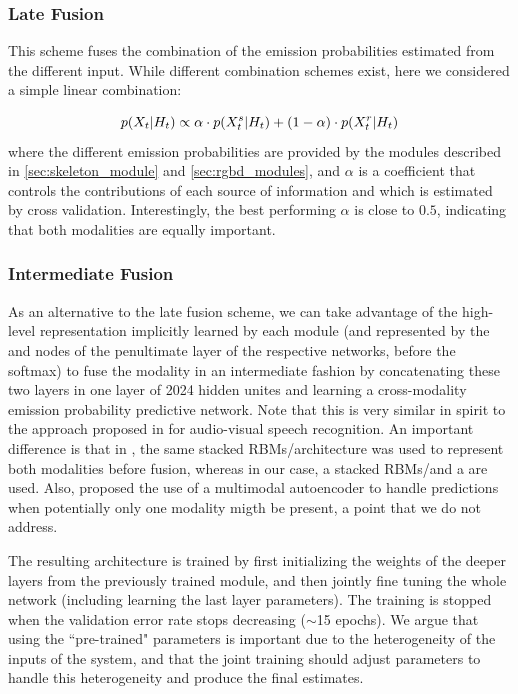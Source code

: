 \subsubsection{Late Fusion}
%
This scheme fuses the combination of the emission probabilities estimated from the different input.
While different combination schemes exist, here we considered a simple linear combination:

\begin{equation}
 p(X_t | H_t)  \propto  \alpha \cdot  p(X_t^s | H_t) + (1-\alpha)\cdot p(X_t^r | H_t)
\end{equation}
where the different emission probabilities are provided by the modules described in \ref{sec:skeleton_module} and \ref{sec:rgbd_modules},
and $\alpha$ is a coefficient that controls the contributions of each source of information and which is estimated by cross validation.
Interestingly, the best performing $\alpha$ is close to $0.5$, indicating that both modalities are equally important.


\subsubsection{Intermediate Fusion}
\label{early_fusion}

As an alternative to the late fusion scheme, we can take advantage of the high-level representation implicitly learned by each module
(and represented by the \highSK and \highRGBD nodes of the penultimate layer of the respective networks, before the softmax)
to fuse the modality in an intermediate fashion by concatenating these two layers in one layer of 2024 hidden unites
and learning a cross-modality emission probability predictive network.
%
Note that this is very similar in spirit to the approach proposed in \cite{Ngiam2011multimodal}
for audio-visual speech recognition.
%
An important difference is that in \cite{Ngiam2011multimodal}, the same stacked RBMs/\DBN architecture was used
to represent both modalities before fusion, whereas in our case, a stacked RBMs/\DBN and a \ThreeDCNN are used.
%
Also, \cite{Ngiam2011multimodal} proposed the use of a multimodal autoencoder to handle predictions when potentially
only one modality migth be present, a point that we do not address.

The resulting architecture is trained by first initializing the weights of the deeper layers from the previously trained module,
and then jointly fine tuning the whole network (including learning the last layer parameters).
The training is stopped when the validation error rate stops decreasing ($\sim$15 epochs).
%
We argue that using the ``pre-trained" parameters is important due to the heterogeneity of the inputs of the system,
and that the joint training should adjust parameters to handle  this heterogeneity and produce the final estimates.


